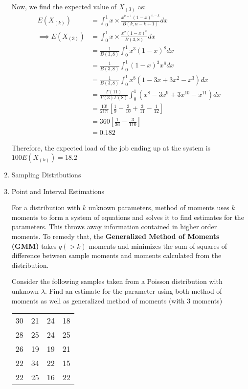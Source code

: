 \documentclass[12pt, oneside]{article}
\begin{document}
\begin{enumerate}
{  Now, we find the expected value of \(X_{(3)}\) as:
  \begin{align*}
    E(X_{(k)}) &= \int_{0}^{1} x \times \frac{x^{k-1} (1-x)^{n-k}}{B(k, n - k + 1)} dx \\
    \implies E(X_{(3)}) &= \int_{0}^{1} x \times \frac{x^{2} (1-x)^{8}}{B(3, 8)} dx \tag*{(\(\because n = 10\))} \\
      &= \frac{1}{B(3, 8)} \int_{0}^{1} x^3 (1 - x)^8 dx \\
      &= \frac{1}{B(3, 8)} \int_{0}^{1} (1 - x)^3 x^8 dx \\
      &= \frac{1}{B(3, 8)} \int_{0}^{1} x^8 (1 - 3x + 3x^2 - x^3) dx \\
      &= \frac{\Gamma(11)}{\Gamma(3)\Gamma(8)} \int_{0}^{1} (x^8 - 3x^9 + 3x^{10} - x^{11}) dx \\
      &= \frac{10!}{2!\,7!} \left[\frac{1}{9} - \frac{3}{10} + \frac{3}{11} - \frac{1}{12}\right] \\
      &= 360 \left[ \frac{1}{36} - \frac{3}{110} \right] \\
      &= 0.182
  \end{align*}

  Therefore, the expected load of the job ending up at the  system is \(100E(X_{(k)}) = 18.2\)
}



\item	Sampling Distributions 


\item	{
  Point and Interval Estimations

  For a distribution with \(k\) unknown parameters, method of moments uses \(k\) moments
  to form a system of equations and solves it to find estimates for the parameters.
  This throws away information contained in higher order moments. To remedy that, the
  \textbf{Generalized Method of Moments (GMM)} takes \(q (> k)\) moments and minimizes
  the sum of squares of difference between sample moments and moments calculated from
  the distribution.

  Consider the following samples taken from a Poisson distribution with unknown \(\lambda\).
  Find an estimate for the parameter using both method of moments as well as generalized
  method of moments (with 3 moments)

  \begin{center}
  \begin{tabular}{cccc}
    \toprule
    30 & 21 & 24 & 18 \\
    28 & 25 & 24 & 25 \\
    26 & 19 & 19 & 21 \\
    22 & 34 & 22 & 15 \\
    22 & 25 & 16 & 22 \\
    \bottomrule
  \end{tabular}
  \end{center}

}
\end{enumerate}
\end{document}
